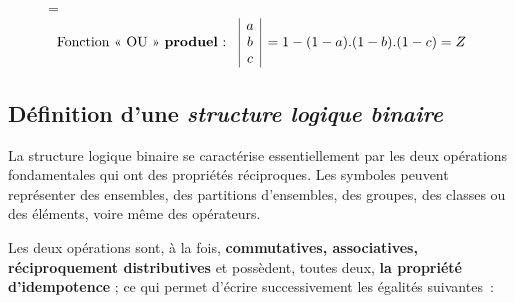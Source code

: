 \begin{figure}[htb]
 \vspace{1cm}

=\hbox{$\begin{array}{r|c|l}
 & a\\
\text{Fonction «  OU » {\bf produel} : }  & b & =1-(1-a).(1-b).(1-c)=Z\\
 & c
\end{array}$} 

\caption{}

\label{fig:OU} 
\end{figure}

\subsection{Définition d'une \emph{structure logique binaire}}

La structure logique binaire se caractérise essentiellement par les
deux opérations fondamentales qui ont des propriétés réciproques.
Les symboles peuvent représenter des ensembles, des partitions d'ensembles,
des groupes, des classes ou des éléments, voire même des opérateurs.

Les deux opérations sont, à la fois, \textbf{commutatives, associatives,
réciproquement distributives} et possèdent, toutes deux, \textbf{la
propriété d'idempotence} ; ce qui permet d'écrire successivement les
égalités suivantes~:

